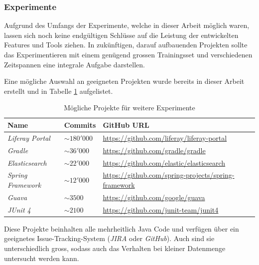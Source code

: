 \documentclass[10pt, a4paper]{article}
\begin{document}
\subsubsection{Experimente} \label{sec:outlook_experiments}

Aufgrund des Umfangs der Experimente, welche in dieser Arbeit möglich waren, lassen sich noch keine endgültigen Schlüsse auf die Leistung der entwickelten Features und Tools ziehen. In zukünftigen, darauf aufbauenden Projekten sollte das Experimentieren mit einem genügend grossen Trainingsset und verschiedenen Zeitspannen eine integrale Aufgabe darstellen.

Eine mögliche Auswahl an geeigneten Projekten wurde bereits in dieser Arbeit erstellt und in Tabelle \ref{tab:suitable_projects} aufgelistet.
\begin{table}[H]
	\begin{tabular}{l|l|p{5cm}}	
		\textbf{Name} & \textbf{Commits} & \textbf{GitHub URL}\\
		\hline	
		\emph{Liferay Portal} & $\sim180'000$ & \url{https://github.com/liferay/liferay-portal}\\
		\hline	
		\emph{Gradle} & $\sim36'000$ & \url{https://github.com/gradle/gradle}\\
		\hline	
		\emph{Elasticsearch} & $\sim22'000$ & \url{https://github.com/elastic/elasticsearch}\\
		\hline	
		\emph{Spring Framework} & $\sim12'000$ & \url{https://github.com/spring-projects/spring-framework}\\
		\hline	
		\emph{Guava} & $\sim3500$ & \url{https://github.com/google/guava}\\
		\hline	
		\emph{JUnit 4} & $\sim2100$ & \url{https://github.com/junit-team/junit4}\\		
	\end{tabular}
	\caption{Mögliche Projekte für weitere Experimente}
	\centering
	\label{tab:suitable_projects}
\end{table}

Diese Projekte beinhalten alle mehrheitlich Java Code und verfügen über ein geeignetes Issue-Tracking-System (\emph{JIRA} oder \emph{GitHub}). Auch sind sie unterschiedlich gross, sodass auch das Verhalten bei kleiner Datenmenge untersucht werden kann.
\end{document}
